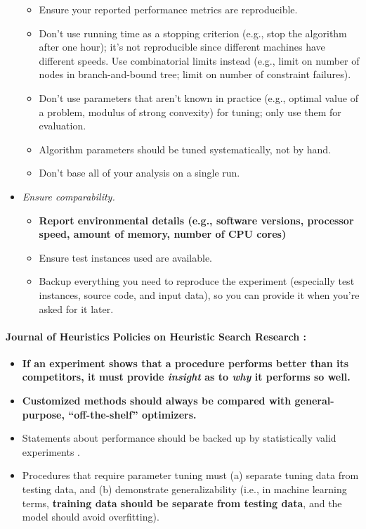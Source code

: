 \documentclass[12pt]{article}
\begin{document}
\begin{itemize}
\begin{itemize}
            \item Ensure your reported performance metrics are reproducible.
            \item Don't use running time as a stopping criterion (e.g., stop the algorithm after one hour); it's not reproducible since different machines have different speeds. Use combinatorial limits instead (e.g., limit on number of nodes in branch-and-bound tree; limit on number of constraint failures).
            \item Don't use parameters that aren't known in practice (e.g., optimal value of a problem, modulus of strong convexity) for tuning; only use them for evaluation.
            \item Algorithm parameters should be tuned systematically, not by hand.
            \item Don't base all of your analysis on a single run.
        \end{itemize}
    \item \emph{Ensure comparability.}
        \begin{itemize}
            \item \textbf{Report environmental details (e.g., software versions, processor speed, amount of memory, number of CPU cores)}
            \item Ensure test instances used are available.
            \item Backup everything you need to reproduce the experiment (especially test instances, source code, and input data), so you can provide it when you're asked for it later.
        \end{itemize}
\end{itemize}

\paragraph{Journal of Heuristics Policies on Heuristic Search Research \cite{JOHpolicies}:}
\begin{itemize}
    \item \textbf{If an experiment shows that a procedure performs better than its competitors, it must provide \emph{insight} as to \emph{why} it performs so well.}
    \item \textbf{Customized methods should always be compared with general-purpose, ``off-the-shelf'' optimizers.}
    \item Statements about performance should be backed up by statistically valid experiments \cite{coffin2000statistical}.
    \item Procedures that require parameter tuning must (a) separate tuning data from testing data, and (b) demonstrate generalizability (i.e., in machine learning terms, \textbf{training data should be separate from testing data}, and the model should avoid overfitting).
\end{itemize}
\end{document}
